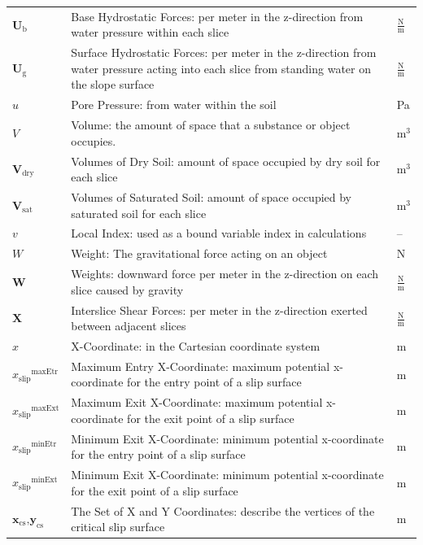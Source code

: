 \documentclass[12pt]{article}
\begin{document}
\begin{longtabu}{l X[l] l}
\\
${\mathbf{U}_{\text{b}}}$ & Base Hydrostatic Forces: per meter in the z-direction from water pressure within each slice & $\frac{\text{N}}{\text{m}}$
\\
${\mathbf{U}_{\text{g}}}$ & Surface Hydrostatic Forces: per meter in the z-direction from water pressure acting into each slice from standing water on the slope surface & $\frac{\text{N}}{\text{m}}$
\\
$u$ & Pore Pressure: from water within the soil & Pa
\\
$V$ & Volume: the amount of space that a substance or object occupies. & $\text{m}^{3}$
\\
${\mathbf{V}_{\text{dry}}}$ & Volumes of Dry Soil: amount of space occupied by dry soil for each slice & $\text{m}^{3}$
\\
${\mathbf{V}_{\text{sat}}}$ & Volumes of Saturated Soil: amount of space occupied by saturated soil for each slice & $\text{m}^{3}$
\\
$v$ & Local Index: used as a bound variable index in calculations & --
\\
$W$ & Weight: The gravitational force acting on an object & N
\\
$\mathbf{W}$ & Weights: downward force per meter in the z-direction on each slice caused by gravity & $\frac{\text{N}}{\text{m}}$
\\
$\mathbf{X}$ & Interslice Shear Forces: per meter in the z-direction exerted between adjacent slices & $\frac{\text{N}}{\text{m}}$
\\
$x$ & X-Coordinate: in the Cartesian coordinate system & m
\\
${{x_{\text{slip}}}^{\text{maxEtr}}}$ & Maximum Entry X-Coordinate: maximum potential x-coordinate for the entry point of a slip surface & m
\\
${{x_{\text{slip}}}^{\text{maxExt}}}$ & Maximum Exit X-Coordinate: maximum potential x-coordinate for the exit point of a slip surface & m
\\
${{x_{\text{slip}}}^{\text{minEtr}}}$ & Minimum Exit X-Coordinate: minimum potential x-coordinate for the entry point of a slip surface & m
\\
${{x_{\text{slip}}}^{\text{minExt}}}$ & Minimum Exit X-Coordinate: minimum potential x-coordinate for the exit point of a slip surface & m
\\
${\mathbf{x}_{\text{cs}}}\text{,}{\mathbf{y}_{\text{cs}}}$ & The Set of X and Y Coordinates: describe the vertices of the critical slip surface & m
\\

\end{longtabu}
\end{document}
